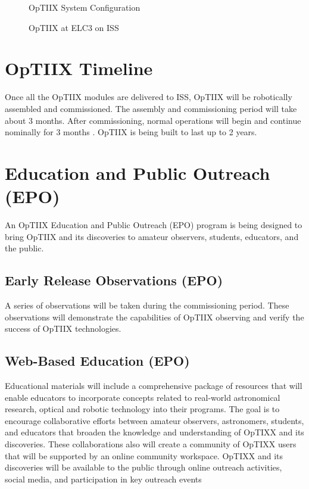 \documentclass[11pt,twoside]{article}
\begin{document}
\begin{figure}[ht!]
\caption{OpTIIX System Configuration}
\end{figure}

\begin{figure}[ht!]
\caption{OpTIIX at ELC3 on ISS}
\end{figure}

\section{OpTIIX Timeline}
Once all the OpTIIX modules are delivered to ISS, OpTIIX will be robotically assembled and commissioned.  The assembly and commissioning period will take about 3 months.  After commissioning, normal operations will begin and continue nominally for 3 months .  OpTIIX is being built to last up to 2 years.

\section{Education and Public Outreach (EPO)}
An OpTIIX Education and Public Outreach (EPO) program is being designed to bring OpTIIX and its discoveries to amateur observers, students, educators, and the public.

\subsection{Early Release Observations (EPO)}
A series of observations will be taken during the commissioning period.   These observations will demonstrate the capabilities of OpTIIX observing and verify the success of OpTIIX technologies.

\subsection{Web-Based Education (EPO)}
Educational materials will include a comprehensive package of resources that will enable educators to incorporate concepts related to real-world astronomical research, optical and robotic technology into their programs. The goal is to encourage collaborative efforts between amateur observers, astronomers, students, and educators that broaden the knowledge and understanding of OpTIXX and its discoveries. These collaborations also will create a community of OpTIXX users that will be supported by an online community workspace. OpTIXX and its discoveries will be available to the public through online outreach activities, social media, and participation in key outreach events
\end{document}
